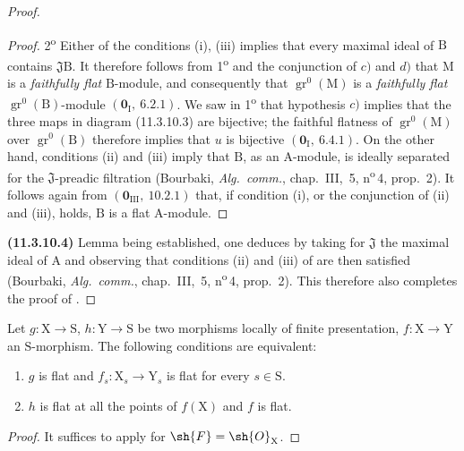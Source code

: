 \begin{proof}
\begin{proof}
2\textsuperscript{o} Either of the conditions (i), (iii) implies that every maximal ideal of $\mathrm{B}$ contains $\mathfrak{J}\mathrm{B}$. It therefore follows from 1\textsuperscript{o} and the conjunction of $c)$ and $d)$ that $\mathrm{M}$ is a \emph{faithfully flat} $\mathrm{B}$-module, and consequently that $\operatorname{gr}^0(\mathrm{M})$ is a \emph{faithfully flat} $\operatorname{gr}^0(\mathrm{B})$-module $(\mathbf{0}_{\mathrm{I}},~6.2.1)$. We saw in 1\textsuperscript{o} that hypothesis $c)$ implies that the three maps in diagram \textup{(11.3.10.3)} are bijective; the faithful flatness of $\operatorname{gr}^0(\mathrm{M})$ over $\operatorname{gr}^0(\mathrm{B})$ therefore implies that $u$ is bijective $(\mathbf{0}_{\mathrm{I}},~6.4.1)$. On the other hand, conditions (ii) and (iii) imply that $\mathrm{B}$, as an $\mathrm{A}$-module, is ideally separated for the $\mathfrak{J}$-preadic filtration (Bourbaki, \emph{Alg.\ comm.}, chap.~III, \textsection\,5, n\textsuperscript{o}\,4, prop.~2). It follows again from $(\mathbf{0}_{\mathrm{III}},~10.2.1)$ that, if condition (i), or the conjunction of (ii) and (iii), holds, $\mathrm{B}$ is a flat $\mathrm{A}$-module.
\end{proof}

\textbf{(11.3.10.4)} Lemma  being established, one deduces  by taking for $\mathfrak{J}$ the maximal ideal of $\mathrm{A}$ and observing that conditions (ii) and (iii) of  are then satisfied (Bourbaki, \emph{Alg.\ comm.}, chap.~III, \textsection\,5, n\textsuperscript{o}\,4, prop.~2). This therefore also completes the proof of .
\end{proof}

\begin{corollary}[11.3.11]
\label{IV.11.3.11}
Let $g:\mathrm{X}\to\mathrm{S}$, $h:\mathrm{Y}\to\mathrm{S}$ be two morphisms locally of finite presentation, $f:\mathrm{X}\to\mathrm{Y}$ an $\mathrm{S}$-morphism. The following conditions are equivalent:
\begin{enumerate}[label=\emph{\alph*)}]
  \item $g$ is flat and $f_s:\mathrm{X}_s\to\mathrm{Y}_s$ is flat for every $s\in\mathrm{S}$.
  \item $h$ is flat at all the points of $f(\mathrm{X})$ and $f$ is flat.
\end{enumerate}
\end{corollary}

\begin{proof}
It suffices to apply  for $\sh{F}=\sh{O}_\mathrm{X}$.
\end{proof}

